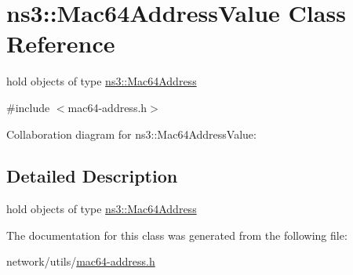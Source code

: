 \hypertarget{classns3_1_1Mac64AddressValue}{}\section{ns3\+:\+:Mac64\+Address\+Value Class Reference}
\label{classns3_1_1Mac64AddressValue}


hold objects of type \hyperlink{classns3_1_1Mac64Address}{ns3\+::\+Mac64\+Address}  




{\ttfamily \#include $<$mac64-\/address.\+h$>$}



Collaboration diagram for ns3\+:\+:Mac64\+Address\+Value\+:


\subsection{Detailed Description}
hold objects of type \hyperlink{classns3_1_1Mac64Address}{ns3\+::\+Mac64\+Address} 

The documentation for this class was generated from the following file\+:\begin{DoxyCompactItemize}
\item 
network/utils/\hyperlink{mac64-address_8h}{mac64-\/address.\+h}\end{DoxyCompactItemize}
